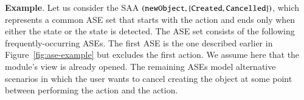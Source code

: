 {%
 
\noindent\textbf{Example}. Let us consider the SAA $ ({\tt newObject}, \{ {\tt Created},{\tt Cancelled} \}) $, which represents a common ASE set that starts with the action  and ends only when either the state  or the state  is detected. The ASE set consists of the following frequently-occurring ASEs. The 
first ASE is the one described earlier in Figure~\ref{fig:ase-example} but excludes the first action. We assume here that the module's view is already opened. The remaining ASEs model alternative scenarios in which the user wants to cancel creating the object at some point between performing the  action and the  action.
%



}
